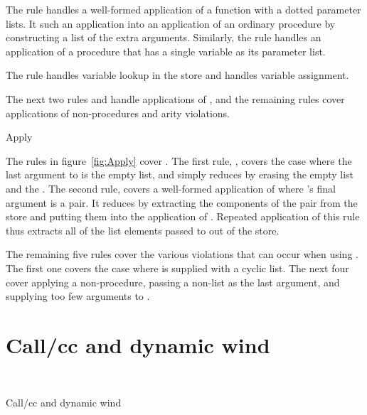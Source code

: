 The rule  handles a well-formed application of a function with a dotted parameter lists. 
It such an application into an application of an
ordinary procedure by constructing a list of the extra arguments. Similarly, the rule  handles an application of a procedure that has a single variable as its parameter list.

The rule  handles variable lookup in the store and  handles variable assignment.

The next two rules  and  handle applications of , and the remaining rules cover applications of non-procedures and arity violations.

\beginfig
\subfigureadjust{}
\begin{center}


\end{center}
\caption{Apply}\label{fig:Apply}
\endfig
\subfigurestop{}

The rules in figure~\ref{fig:Apply} 
cover . 
The first rule, , covers the case where the last argument to
 is the empty list, and simply reduces by erasing the
empty list and the . The second rule, 
covers a well-formed application of  where 's final argument is a pair. It
reduces by extracting the components of the pair from the store and
putting them into the application of . Repeated
application of this rule thus extracts all of the list elements passed
to  out of the store. 

The remaining five rules cover the
various violations that can occur when using . The first one covers the case where  is supplied with a cyclic list. The next four cover applying a
non-procedure, passing a non-list as the last argument, and supplying
too few arguments to .

\section{Call/cc and dynamic wind}

\beginfig
\begin{center}
 \\

\end{center}
\caption{Call/cc and dynamic wind}\label{fig:Call-cc--and--dynamic-wind}
\endfig

